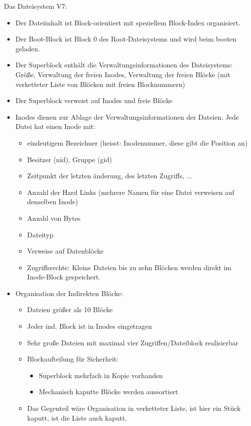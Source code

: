 \begin{answer}
  Das Dateisystem V7: 
  \begin{itemize}
  \item Der Dateiinhalt ist Block-orientiert mit speziellem Block-Index organisiert. 
  \item Der Boot-Block ist Block 0 des Root-Dateisystems und wird beim booten geladen. 
  \item Der Superblock enthält die Verwaltungsinformationen des Dateisystems: Größe, Verwaltung der freien Inodes, Verwaltung der freien Blöcke (mit verketteter Liste von Blöcken mit freien Blocknummern) 
  \item Der Superblock verweist auf Inodes und freie Blöcke
  \item Inodes dienen zur Ablage der Verwaltungsinformationen der Dateien. Jede Datei hat einen Inode mit:
    \begin{itemize}
    \item eindeutigem Bezeichner (heisst: Inodenummer, diese gibt die Position an) 
    \item Besitzer (nid), Gruppe (gid) 
    \item Zeitpunkt der letzten änderung, des letzten Zugriffs, ... 
    \item Anzahl der Hard Links (mehrere Namen für eine Datei verweisen auf denselben Inode) 
    \item Anzahl von Bytes 
    \item Dateityp 
    \item Verweise auf Datenblöcke 
    \item Zugriffsrechte: Kleine Dateien bis zu zehn Blöcken werden direkt im Inode-Block gespeichert.
    \end{itemize}

  \item Organisation der Indirekten Blöcke:
  \begin{itemize}
  \item Dateien größer als 10 Blöcke
  \item Jeder ind. Block ist in Inodes eingetragen
  \item Sehr große Dateien mit maximal vier Zugriffen/Dateiblock realisierbar
  \item Blockaufteilung für Sicherheit: 
  \begin{itemize}
  \item Superblock mehrfach in Kopie vorhanden
  \item Mechanisch kaputte Blöcke werden aussortiert
  \end{itemize}
  \item Das Gegenteil wäre Organisation in verketteter Liste, ist hier ein Stück kaputt, ist die Liste auch kaputt.
  \end{itemize}
  \end{itemize}
\end{answer}

